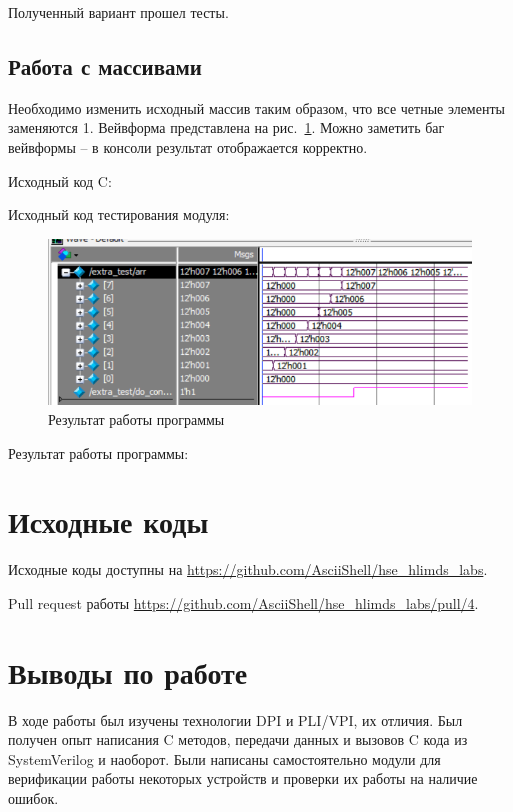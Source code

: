 \documentclass[a4paper,14pt]{article}
\begin{document}
    Полученный вариант прошел тесты.

    \subsection{Работа с массивами}

    Необходимо изменить исходный массив таким образом, что все четные элементы заменяются 1.
    Вейвформа представлена на рис.~\ref{fig:04_extra}.
    Можно заметить баг вейвформы -- в консоли результат отображается корректно.

    Исходный код C:
    {\small {}}

    Исходный код тестирования модуля:
    {\small {}}

    \begin{figure}[H]
        \centering
        \includegraphics[width=\linewidth]{images/04_extra}
        \caption{Результат работы программы}
        \label{fig:04_extra}
    \end{figure}

    Результат работы программы:
    {\small {}}


    \section{Исходные коды}

    Исходные коды доступны на \href{https://github.com/AsciiShell/hse_hlimds_labs}
    {https://github.com/AsciiShell/hse\_hlimds\_labs}.

    Pull request работы \href{https://github.com/AsciiShell/hse_hlimds_labs/pull/4}
    {https://github.com/AsciiShell/hse\_hlimds\_labs/pull/4}.


    \section{Выводы по работе}

    В ходе работы был изучены технологии DPI и PLI/VPI, их отличия.
    Был получен опыт написания C методов, передачи данных и вызовов C кода из SystemVerilog и наоборот.
    Были написаны самостоятельно модули для верификации работы некоторых устройств и проверки их работы на наличие ошибок.
\end{document}
